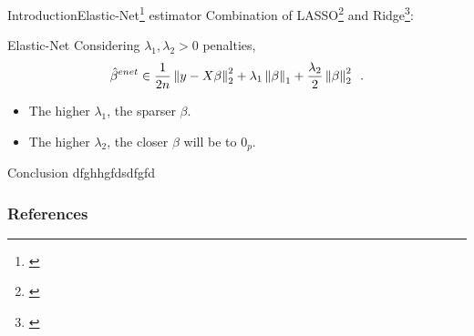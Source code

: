\documentclass[10pt,aspectratio=43]{beamer}
\begin{document}
\begin{frame}{Introduction}{Elastic-Net\footnote[frame]{\citet{Zou_Hastie05}}
             estimator}
Combination of LASSO\footnote[frame]{\citet{Tibshirani96}} and
Ridge\footnote[frame]{\citet{Tikhonov43}}:
\begin{block}{Elastic-Net}
Considering $\lambda_1,\lambda_2>0$ penalties,
\begin{align*}
    \hat\beta^{enet} \in \frac{1}{2n}\left \lVert y - X\beta \right \rVert_2^2
    + \lambda_1 \left \lVert \beta \right \rVert_1
    + \frac{\lambda_2}{2} \left \lVert \beta \right \rVert_2^2 \enspace.
\end{align*}
\end{block}
\begin{itemize}
    \item The higher $\lambda_1$, the sparser $\beta$.
    \item The higher $\lambda_2$, the closer $\beta$ will be to $0_p$.
\end{itemize}
\end{frame}




\begin{frame}{Conclusion}
    dfghhgfdsdfgfd
\end{frame}



\begin{frame}[allowframebreaks]{}
    \frametitle{References}
    
\end{frame}
\end{document}
